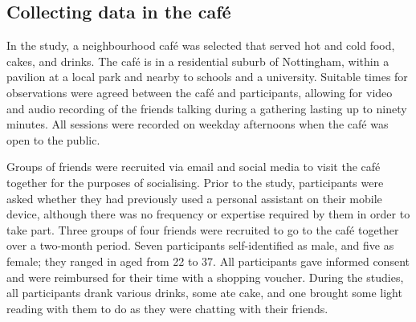 \subsection{Collecting data in the caf\'{e}}\label{sec:empirical cafe design participants}
In the study, a neighbourhood caf\'{e} was selected that served hot and cold food, cakes, and drinks.
The caf\'{e} is in a residential suburb of Nottingham, within a pavilion at a local park and nearby to schools and a university.
Suitable times for observations were agreed between the caf\'{e} and participants, allowing for video and audio recording of the friends talking during a gathering lasting up to ninety minutes.
All sessions were recorded on weekday afternoons when the caf\'{e} was open to the public.

Groups of friends were recruited via email and social media to visit the caf\'{e} together for the purposes of socialising.
Prior to the study, participants were asked whether they had previously used a personal assistant on their mobile device, although there was no frequency or expertise required by them in order to take part.
Three groups of four friends were recruited to go to the caf\'{e} together over a two-month period.
Seven participants self-identified as male, and five as female; they ranged in aged from 22 to 37. %
All participants gave informed consent and were reimbursed for their time with a shopping voucher.
During the studies, all participants drank various drinks, some ate cake, and one brought some light reading with them to do as they were chatting with their friends.





